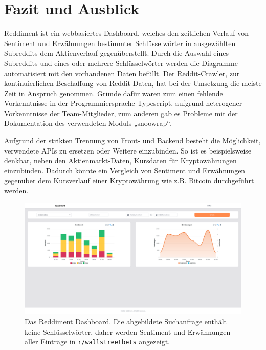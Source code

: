 \documentclass[a4paper, 10pt, conference]{IEEEtran}
\begin{document}
\section{Fazit und Ausblick} \label{s:fazit}

Reddiment ist ein webbasiertes Dashboard, welches den zeitlichen Verlauf von Sentiment und Erwähnungen bestimmter Schlüsselwörter in ausgewählten Subreddits dem Aktienverlauf gegenüberstellt. Durch die Auswahl eines Subreddits und eines oder mehrere Schlüsselwörter werden die Diagramme automatisiert mit den vorhandenen Daten befüllt.
Der Reddit-Crawler, zur kontinuierlichen Beschaffung von Reddit-Daten, hat bei der Umsetzung die meiste Zeit in Anspruch genommen. Gründe dafür waren zum einen fehlende Vorkenntnisse in der Programmiersprache Typescript, aufgrund heterogener Vorkenntnisse der Team-Mitglieder, zum anderen gab es Probleme mit der Dokumentation des verwendeten Moduls „snoowrap“.  

Aufgrund der strikten Trennung von Front- und Backend besteht die Möglichkeit, verwendete APIs zu ersetzen oder Weitere einzubinden. So ist es beispielsweise denkbar, neben den Aktienmarkt-Daten, Kursdaten für Kryptowährungen einzubinden. Dadurch könnte ein Vergleich von Sentiment und Erwähnungen gegenüber dem Kursverlauf einer Kryptowährung wie z.B. Bitcoin durchgeführt werden.

\newpage

\printbibliography

\newpage

\begin{figure}
  \includegraphics[page=1, width=\columnwidth]{Reddiment_Overview}
  \caption{Das Reddiment Dashboard. Die abgebildete Suchanfrage enthält keine Schlüsselwörter, daher werden Sentiment und Erwähnungen aller Einträge in \texttt{r/wallstreetbets} angezeigt.}
  \label{fig:extended_layers}
  \end{figure}
\end{document}
